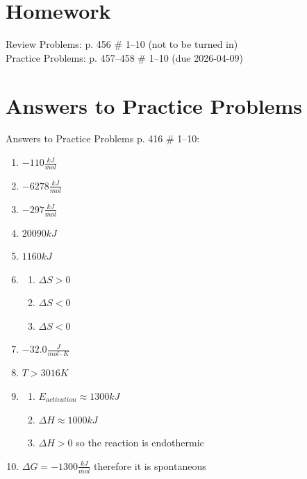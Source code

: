 \documentclass[11pt, oneside]{article}   	%
\begin{document}
\section{Homework}
Review Problems: p. 456 \# 1--10 (not to be turned in)\\
Practice Problems: p. 457--458 \# 1--10 (due 2026-04-09)\\
 
\nocite{feynman-entropy-lecture-video} 
\nocite{reading-feynman-entropy}
\nocite{chem:libretexts:energy-diagrams}
\nocite{wile-chem-2}
%
%

\printbibliography

\clearpage
\section*{Answers to Practice Problems}
Answers to Practice Problems p. 416 \# 1--10:
\begin{enumerate}
\item $- 110 \frac{kJ}{mol}$
\item $- 6278 \frac{kJ}{mol}$
\item $- 297 \frac{kJ}{mol}$
\item $20090 kJ$
\item $1160 kJ$
\item 
\begin{enumerate}
\item $\Delta S > 0$
\item $\Delta S < 0$
\item $\Delta S < 0$
\end{enumerate}
\item $- 32.0 \frac{J}{mol \cdot K}$
\item $T > 3016 K$
\item
\begin{enumerate}
\item $E_{activation} \approx 1300 kJ$
\item $\Delta H \approx 1000 kJ$
\item $\Delta H > 0$ so the reaction is endothermic
\end{enumerate}
\item $\Delta G = -1300 \frac{kJ}{mol}$ therefore it is spontaneous
\end{enumerate}
\end{document}
